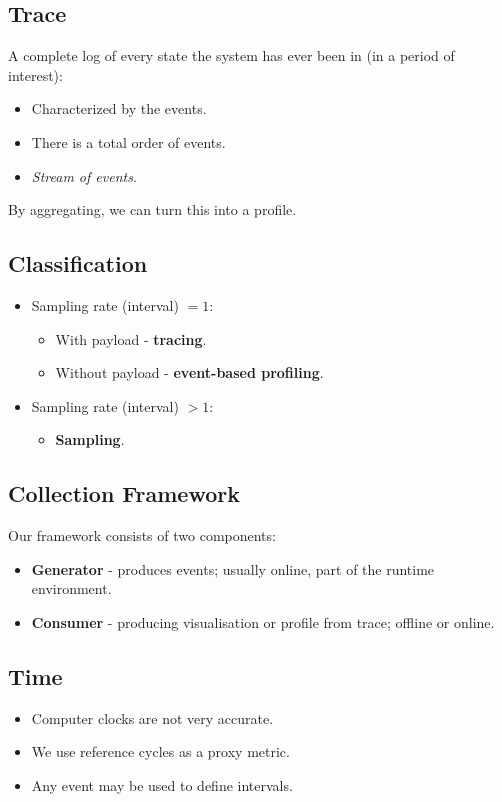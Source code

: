 \documentclass[11pt]{article}
\begin{document}
\subsection{Trace}
A complete log of every state the system has ever been in (in a period of interest):
\begin{itemize}
  \item Characterized by the events.
  \item There is a total order of events.
  \item \textit{Stream of events}.
\end{itemize}
By aggregating, we can turn this into a profile.

\subsection{Classification}
\begin{itemize}
  \item Sampling rate (interval) $=1$:
    \begin{itemize}
      \item With payload - \textbf{tracing}.
      \item Without payload - \textbf{event-based profiling}.
    \end{itemize}
  \item Sampling rate (interval) $>1$:
  \begin{itemize}
    \item \textbf{Sampling}.
  \end{itemize}
\end{itemize}

\subsection{Collection Framework}
Our framework consists of two components:
\begin{itemize}
  \item \textbf{Generator} - produces events; usually online, part of the runtime environment.
  \item \textbf{Consumer} - producing visualisation or profile from trace; offline or online.
\end{itemize}

\subsection{Time}
\begin{itemize}
  \item Computer clocks are not very accurate.
  \item We use reference cycles as a proxy metric.
  \item Any event may be used to define intervals.
\end{itemize}
\end{document}
